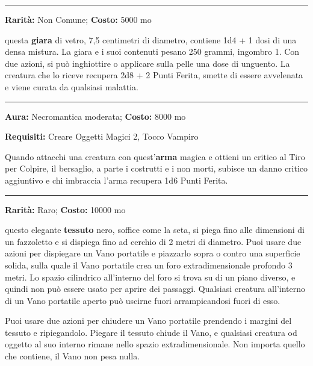 \begin{multicols}{2}
\smallskip\noindent\rule{\linewidth}{2pt}  \hypertarget{UnguentodiLjust}{}\smallskip{}\noindent\label{UnguentodiLjust}

\textbf{Rarità:} Non Comune; \textbf{Costo:} 5000 mo

questa \textbf{giara} di vetro, 7,5 centimetri di diametro, contiene 1d4 + 1 dosi di una densa mistura. La giara e i suoi contenuti pesano 250 grammi, ingombro 1. Con due azioni, si può inghiottire o applicare sulla pelle una dose di unguento. La creatura che lo riceve recupera 2d8 + 2 Punti Ferita, smette di essere avvelenata e viene curata da qualsiasi malattia.

\smallskip\noindent\rule{\linewidth}{2pt}  \hypertarget{Vampira}{}\smallskip{}\noindent\label{Vampira}

\textbf{Aura:} Necromantica moderata; \textbf{Costo:} 8000 mo

\textbf{Requisiti:} Creare Oggetti Magici 2, Tocco Vampiro

Quando attacchi una creatura con quest'\textbf{arma} magica e ottieni un critico al Tiro per Colpire, il bersaglio, a parte i costrutti e i non morti, subisce un danno critico aggiuntivo e chi imbraccia l'arma recupera 1d6 Punti Ferita.

\smallskip\noindent\rule{\linewidth}{2pt}  \hypertarget{VanoPortatile}{}\smallskip{}\noindent\label{VanoPortatile}

\textbf{Rarità:} Raro; \textbf{Costo:} 10000 mo

questo elegante \textbf{tessuto} nero, soffice come la seta, si piega fino alle dimensioni di un fazzoletto e si dispiega fino ad cerchio di 2 metri di diametro. Puoi usare due azioni per dispiegare un Vano portatile e piazzarlo sopra o contro una superficie solida, sulla quale il Vano portatile crea un foro extradimensionale profondo 3 metri. Lo spazio cilindrico all'interno del foro si trova su di un piano diverso, e quindi non può essere usato per aprire dei passaggi. Qualsiasi creatura all'interno di un Vano portatile aperto può uscirne fuori arrampicandosi fuori di esso.

Puoi usare due azioni per chiudere un Vano portatile prendendo i margini del tessuto e ripiegandolo. Piegare il tessuto chiude il Vano, e qualsiasi creatura od oggetto al suo interno rimane nello spazio extradimensionale. Non importa quello che contiene, il Vano non pesa nulla.


\end{multicols}
